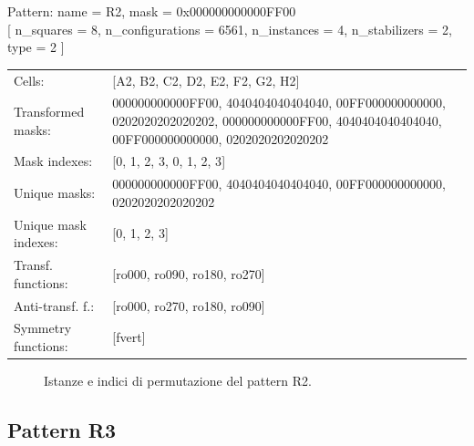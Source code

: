 \begin{tcolorbox}[sharp corners, fontupper=\ttfamily\small, colback=white]
  \noindent Pattern: name = R2, mask = 0x000000000000FF00\\
  {[} n\_squares = 8, n\_configurations = 6561,
  n\_instances = 4, n\_stabilizers = 2, type = 2 { ]}\\[1.0ex]
  \begin{tabularx}{\textwidth}{@{} p{3.5cm} X @{}}
    Cells:               & {[}A2, B2, C2, D2, E2, F2, G2, H2{]}\\[0.5ex]
    Transformed masks:   & 000000000000FF00, 4040404040404040, 00FF000000000000, 0202020202020202, 000000000000FF00, 4040404040404040, 00FF000000000000, 0202020202020202\\[0.5ex]
    Mask indexes:        & {[}0, 1, 2, 3, 0, 1, 2, 3{]}\\[0.5ex]
    Unique masks:        & 000000000000FF00, 4040404040404040, 00FF000000000000, 0202020202020202\\[0.5ex]
    Unique mask indexes: & {[}0, 1, 2, 3{]}\\[0.5ex]
    Transf. functions:   & {[}ro000, ro090, ro180, ro270{]}\\[0.5ex]
    Anti-transf. f.:     & {[}ro000, ro270, ro180, ro090{]}\\[0.5ex]
    Symmetry functions:  & {[}fvert{]}\\[0.5ex]
  \end{tabularx}
\end{tcolorbox}

\begin{figure}[htbp]
  \centering
   \hfill
   \hfill
   \hfill
  \vspace{0.3cm}
   \hfill
   \hfill
   \hfill
  \caption{Istanze e indici di permutazione del pattern R2.}
\end{figure}

\newpage

\subsection{Pattern R3}

